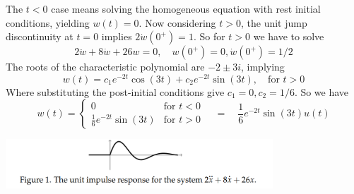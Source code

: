 \documentclass{report}
\begin{document}
The $t<0$ case means solving the homogeneous equation with rest initial conditions, yielding $w(t)=0$. Now
considering $t>0$, the
unit jump discontinuity at $t=0$ implies $2\dot{w}(0^+)=1$. So for $t>0$ we have to solve
\begin{equation*}
2\ddot{w}+8\dot{w}+26w=0,\quad w(0^+)=0,\dot{w}(0^+)=1/2
\end{equation*}
The roots of the characteristic polynomial are $-2\pm3i$, implying
\begin{equation*}
w(t)=c_1e^{-2t}\cos(3t)+c_2e^{-2t}\sin(3t),\quad\text{for }t>0
\end{equation*}
Where substituting the post-initial conditions give $c_1=0,c_2=1/6$. So we have
\begin{equation*}
w(t)=\begin{cases}
0&\text{for }t<0\\
\frac{1}{6}e^{-2t}\sin(3t)&\text{for }t>0
\end{cases}\quad=\quad\frac{1}{6}e^{-2t}\sin(3t)u(t)
\end{equation*}
\begin{center}
\includegraphics[width=10cm]{55}\\
\end{center}
\newpage
\end{document}

